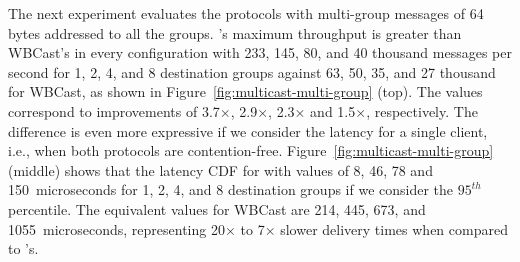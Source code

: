 The next experiment evaluates the protocols with multi-group messages of 64 bytes addressed to all the groups.
\libname's maximum throughput is greater than WBCast's in every configuration with 233, 145, 80, and 40 thousand messages per second for 1, 2, 4, and 8 destination groups against 63, 50, 35, and 27 thousand for WBCast, as shown in Figure~\ref{fig:multicast-multi-group} (top).
The values correspond to improvements of 3.7$\times$, 2.9$\times$, 2.3$\times$ and 1.5$\times$, respectively.
The difference is even more expressive if we consider the latency for a single client, i.e., when both protocols are contention-free. Figure~\ref{fig:multicast-multi-group} (middle) shows that the latency CDF for \libname with values of 8, 46, 78 and 150~microseconds for 1, 2, 4, and 8 destination groups if we consider the $95^{th}$ percentile. 
The equivalent values for WBCast are 214, 445, 673, and 1055~microseconds, representing 20$\times$ to 7$\times$ slower delivery times when compared to \libname's.


